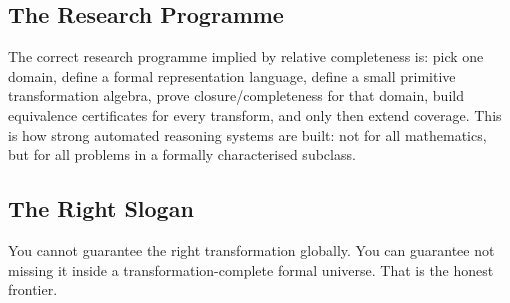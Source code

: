 \subsection{The Research Programme}
The correct research programme implied by relative completeness is: pick one domain, define a formal representation language, define a small primitive transformation algebra, prove closure/completeness for that domain, build equivalence certificates for every transform, and only then extend coverage. This is how strong automated reasoning systems are built: not for all mathematics, but for all problems in a formally characterised subclass.

\subsection{The Right Slogan}
You cannot guarantee the right transformation globally. You can guarantee not missing it inside a transformation-complete formal universe. That is the honest frontier.
